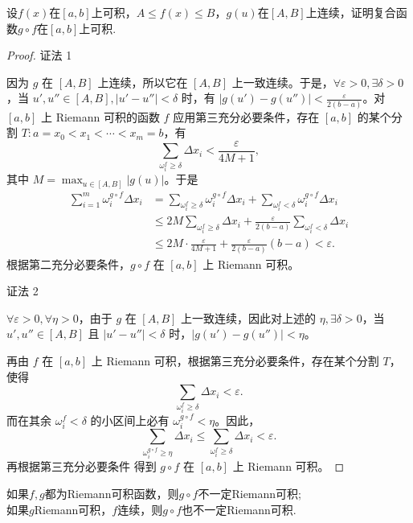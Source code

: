 \documentclass[lang=cn,12pt]{elegantbook}
\begin{document}
\begin{example}
    设$f(x)$在$[a,b]$上可积，$A \leq f(x)\leq B$，$g(u)$在$[A,B]$上连续，证明复合函数$g \circ  f$在$[a,b]$上可积.
\end{example}

\begin{proof}
证法 1

因为 \(g\) 在 \([A,B]\) 上连续，所以它在 \([A,B]\) 上一致连续。于是，\(\forall \varepsilon > 0, \exists \delta > 0\)，当  
\(u', u'' \in [A,B], |u' -u''| < \delta\) 时，有 \(|g(u') - g(u'')| < \frac{\varepsilon}{2(b - a)}\)。对 \([a, b]\) 上 Riemann 可积的函数 \(f\) 应用第三充分必要条件，存在 \([a, b]\) 的某个分割 \(T: a= x_0 < x_1 < \cdots < x_m = b\)，有  
\[
\sum_{\omega_i^f \geq \delta} \Delta x_i < \frac{\varepsilon}{4M + 1},
\]
其中 \(M = \max_{u \in [A,B]} |g(u)|\)。于是  
\[
\begin{aligned}
\sum_{i=1}^m \omega_i^{g\circ f} \Delta x_i 
&= \sum_{\omega_i^f \geq \delta} \omega_i^{g\circ f} \Delta x_i + \sum_{\omega_i^f < \delta} \omega_i^{g\circ  f} \Delta x_i \\
&\leq 2M \sum_{\omega_i^f \geq \delta} \Delta x_i + \frac{\varepsilon}{2(b - a)} \sum_{\omega_i^f < \delta} \Delta x_i \\
&\leq 2M \cdot \frac{\varepsilon}{4M + 1} + \frac{\varepsilon}{2(b - a)} (b - a) < \varepsilon.
\end{aligned}
\]
根据第二充分必要条件，\(g \circ  f\) 在 \([a, b]\) 上 Riemann 可积。

证法 2

\(\forall \varepsilon > 0, \forall \eta > 0\)，由于 \(g\) 在 \([A,B]\) 上一致连续，因此对上述的 \(\eta, \exists \delta > 0\)，当 \(u', u'' \in [A,B]\) 且 \(|u' - u''| < \delta\) 时，\(|g(u') - g(u'')| < \eta\)。  

再由 \(f\) 在 \([a, b]\) 上 Riemann 可积，根据第三充分必要条件，存在某个分割 \(T\)，使得  
\[
\sum_{\omega_i^f \geq \delta} \Delta x_i < \varepsilon.
\]
而在其余 \(\omega_i^f < \delta\) 的小区间上必有 \(\omega_i^{g \circ f} < \eta\)。因此，  
\[
\sum_{\omega_i^{g\circ  f} \geq \eta} \Delta x_i \leq \sum_{\omega_i^f \geq \delta} \Delta x_i < \varepsilon.
\]
再根据第三充分必要条件 得到 \(g\circ  f\) 在 \([a, b]\) 上 Riemann 可积。
\end{proof}

\begin{remark}
    如果$f,g$都为Riemann可积函数，则$g\circ f$不一定Riemann可积; \\
    如果$g$Riemann可积，$f$连续，则$g\circ f$也不一定Riemann可积.
\end{remark}
\end{document}
